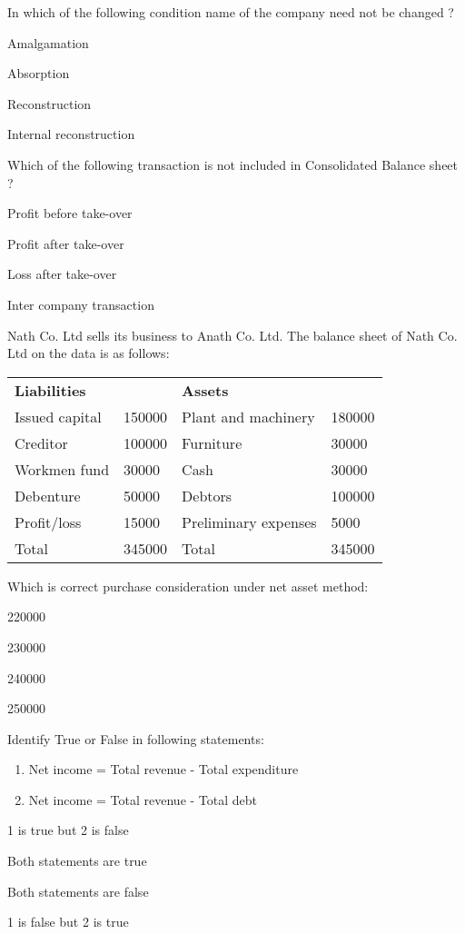 \begin{questions}
\question In which of the following condition name of the company need not be changed ?
  \begin{items}
  \item Amalgamation
  \item Absorption
  \item Reconstruction
  \item Internal reconstruction
  \end{items}

\question Which of the following transaction is not included in Consolidated Balance sheet ?
  \begin{items}
  \item Profit before take-over
  \item Profit after take-over
  \item Loss after take-over
  \item Inter company transaction
  \end{items}

\question Nath Co. Ltd sells its business to Anath Co. Ltd. The balance sheet of Nath Co. Ltd on the data is as follows:
  \begin{table}[h]
  \centering
  \begin{tabular}{llll}
    \textbf{Liabilities} & & \textbf{Assets} & \\[2mm]
    Issued capital & 150000 & Plant and machinery & 180000 \\
    Creditor & 100000 & Furniture & 30000 \\
    Workmen fund & 30000 & Cash & 30000 \\
    Debenture & 50000 & Debtors & 100000 \\
    Profit/loss & 15000 & Preliminary expenses & 5000 \\
    Total & 345000 & Total & 345000
  \end{tabular}
  \end{table}
  Which is correct purchase consideration under net asset method:
  \begin{items}
  \item 220000
  \item 230000
  \item 240000
  \item 250000
  \end{items}

\question Identify True or False in following statements:
  \begin{enumerate}
  \item Net income = Total revenue - Total expenditure
  \item Net income = Total revenue - Total debt
  \end{enumerate}
  \begin{items}
  \item 1 is true but 2 is false
  \item Both statements are true
  \item Both statements are false
  \item 1 is false but 2 is true
  \end{items}


\end{questions}
